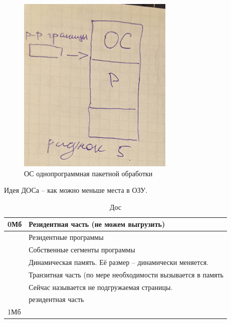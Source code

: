 \begin{figure}[H]
	\centering
	\includegraphics[width=\textwidth]{pic/6.png}
	\caption{ОС однопрограммная пакетной обработки}
\end{figure}

Идея ДОСа – как можно меньше места в ОЗУ. 

\begin{table}[H]
\caption{Дос}
\begin{tabular}{|l|l|}
\hline
0Мб & Резидентная часть  (не можем выгрузить)\\
\hline
& Резидентные программы\\
\hline
& Собственные сегменты программы\\
\hline
& Динамическая память. Её размер – динамически меняется.\\
\hline
& Транзитная часть (по мере необходимости вызывается в память\\
& Сейчас называется не подгружаемая страницы.\\
\hline
& резидентная часть\\
1Мб & \\
\hline
\end{tabular}
\end{table}

